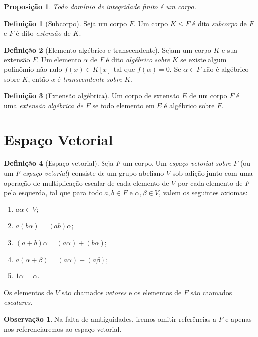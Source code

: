\documentclass[a4paper,12pt]{report}
\theoremstyle{plain}
\newtheorem{proposicao}{Proposição}[section]
\theoremstyle{definition}
\newtheorem{definicao}{Definição}[section]
\newtheorem{observacao}{Observação}[section]
\begin{document}
\begin{proposicao}
	Todo domínio de integridade finito é um corpo.
\end{proposicao}

\begin{definicao}[Subcorpo]
	Seja um corpo $F$. Um corpo $K\leq F$ é dito \emph{subcorpo} de $F$ e $F$ é dito \emph{extensão} de $K$.
\end{definicao}

\begin{definicao}[Elemento algébrico e transcendente]
	Sejam um corpo $K$ e sua extensão $F$. Um elemento $\alpha$ de $F$ é dito \emph{algébrico sobre} $K$ se existe algum polinômio não-nulo $f(x) \in K[x]$ tal que $f(\alpha) = 0$. Se $\alpha\in F$ não é algébrico sobre $K$, então $\alpha$ é \emph{transcendente sobre} $K$.
\end{definicao}

\begin{definicao}[Extensão algébrica]
	Um corpo de extensão $E$ de um corpo $F$ é uma \emph{extensão algébrica de $F$} se todo elemento em $E$ é algébrico sobre $F$.
\end{definicao}

\section{Espaço Vetorial}

 \begin{definicao}[Espaço vetorial]
	Seja $F$ um corpo. Um \emph{espaço vetorial sobre} $F$ (ou um $F$-\emph{espaço vetorial}) consiste de um grupo abeliano $V$ sob adição junto com uma operação de multiplicação escalar de cada elemento de $V$ por cada elemento de $F$ pela esquerda, tal que para todo $a,b\in F$ e $\alpha,\beta\in V$, valem os seguintes axiomas:
	\begin{enumerate}
		\item $a\alpha\in V$;
		\item $a(b\alpha) = (ab)\alpha$;
		\item $(a+b)\alpha = (a\alpha)+(b\alpha)$;
		\item $a(\alpha+\beta) = (a\alpha)+(a\beta)$;
		\item $1\alpha = \alpha$.
	\end{enumerate}
	Os elementos de $V$ são chamados \emph{vetores} e os elementos de $F$ são chamados \emph{escalares}.
\end{definicao}

\begin{observacao}
	Na falta de ambiguidades, iremos omitir referências a $F$ e apenas nos referenciaremos ao espaço vetorial.
\end{observacao}
\end{document}
